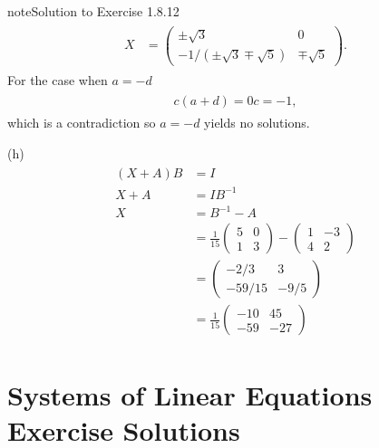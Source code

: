 \documentclass[letterpaper,10pt,english]{jupyterBook}
\begin{document}
\begin{sphinxadmonition}{note}{Solution to Exercise 1.8.12}
\begin{equation*}
\begin{split}
\begin{align*}
    X &= \begin{pmatrix} \pm \sqrt{3} & 0 \\ - 1 / (\pm \sqrt{3} \mp \sqrt{5}) & \mp\sqrt{5} \end{pmatrix}.
\end{align*} \end{split}
\end{equation*}
\sphinxAtStartPar
For the case when \(a = -d\)
\begin{equation*}
\begin{split} \begin{align*}
    c(a + d) = 0c = -1,
\end{align*} \end{split}
\end{equation*}
\sphinxAtStartPar
which is a contradiction so \(a = -d\) yields no solutions.

\sphinxAtStartPar
(h)
\begin{equation*}
\begin{split} \begin{align*}
    (X + A)B &= I \\
    X + A &= I B^{-1} \\
    X &= B^{-1} - A \\
    &= \frac{1}{15} \begin{pmatrix} 5 & 0 \\ 1 & 3 \end{pmatrix} - 
    \begin{pmatrix} 1 & -3 \\ 4 & 2 \end{pmatrix} \\
    &= \begin{pmatrix} -2/3 & 3 \\ -59/15 & -9/5 \end{pmatrix} \\
    &= \frac{1}{15} \begin{pmatrix} -10 & 45 \\ -59 & -27 \end{pmatrix}
\end{align*} \end{split}
\end{equation*}\end{sphinxadmonition}

\sphinxstepscope


\chapter{Systems of Linear Equations Exercise Solutions}
\label{\detokenize{_pages/A2_Linear_systems_exercises_solutions:systems-of-linear-equations-exercise-solutions}}\label{\detokenize{_pages/A2_Linear_systems_exercises_solutions:systems-exercises-solutions}}\label{\detokenize{_pages/A2_Linear_systems_exercises_solutions::doc}} \label{_pages/A2_Linear_systems_exercises_solutions:_pages/A2_Linear_systems_exercises_solutions-solution-0}
\end{document}

